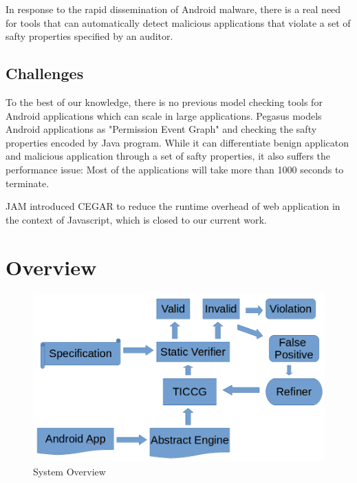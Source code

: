\documentclass{article}
\begin{document}
In response to the  rapid dissemination of 
Android malware, there is  a real need for tools that can automatically
detect malicious applications that violate a set of safty properties 
specified by an auditor.

\subsection{Challenges}
To the best of our knowledge, there is no previous model checking tools for 
Android applications which can scale in large applications.
Pegasus\cite{pegasus} models Android applications as "Permission Event Graph"
and checking the safty properties encoded by Java program. While it can 
differentiate benign applicaton and malicious application through a set 
of safty properties, it also suffers the performance issue: Most of the 
applications will take more than 1000 seconds to terminate. 

JAM\cite{cegar12} introduced CEGAR to reduce the runtime overhead of web 
application in the context of Javascript, which is closed
to our current work.

\section{Overview}
\label{sec:overview}

\begin{figure}
\centerline{\includegraphics[scale=0.4]{sysgraph}}
\caption{System Overview}
\label{fig:one}
\end{figure}
\end{document}
